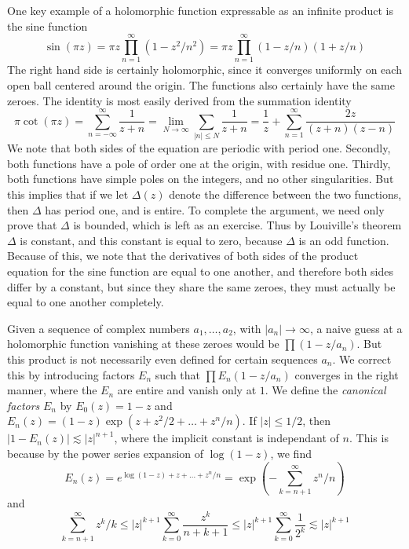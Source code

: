 \begin{example}
    One key example of a holomorphic function expressable as an infinite product is the sine function
    \[ \sin(\pi z) = \pi z \prod_{n = 1}^\infty (1 - z^2/n^2) = \pi z \prod_{n = 1}^\infty (1 - z/n)(1 + z/n) \]
    The right hand side is certainly holomorphic, since it converges uniformly on each open ball centered around the origin. The functions also certainly have the same zeroes. The identity is most easily derived from the summation identity
    \[ \pi \cot(\pi z) = \sum_{n = -\infty}^\infty \frac{1}{z + n} = \lim_{N \to \infty} \sum_{|n| \leq N} \frac{1}{z + n} = \frac{1}{z} + \sum_{n = 1}^\infty \frac{2z}{(z + n)(z - n)} \]
    We note that both sides of the equation are periodic with period one. Secondly, both functions have a pole of order one at the origin, with residue one. Thirdly, both functions have simple poles on the integers, and no other singularities. But this implies that if we let $\Delta(z)$ denote the difference between the two functions, then $\Delta$ has period one, and is entire. To complete the argument, we need only prove that $\Delta$ is bounded, which is left as an exercise. Thus by Louiville's theorem $\Delta$ is constant, and this constant is equal to zero, because $\Delta$ is an odd function. Because of this, we note that the derivatives of both sides of the product equation for the sine function are equal to one another, and therefore both sides differ by a constant, but since they share the same zeroes, they must actually be equal to one another completely.
\end{example}

Given a sequence of complex numbers $a_1, \dots, a_2$, with $|a_n| \to \infty$, a naive guess at a holomorphic function vanishing at these zeroes would be $\prod (1 - z/a_n)$. But this product is not necessarily even defined for certain sequences $a_n$. We correct this by introducing factors $E_n$ such that $\prod E_n(1 - z/a_n)$ converges in the right manner, where the $E_n$ are entire and vanish only at $1$. We define the {\it canonical factors} $E_n$ by $E_0(z) = 1 - z$ and $E_n(z) = (1 - z)\exp(z + z^2/2 + \dots + z^n/n)$. If $|z| \leq 1/2$, then $|1 - E_n(z)| \lesssim |z|^{n+1}$, where the implicit constant is independant of $n$. This is because by the power series expansion of $\log(1 - z)$, we find
%
\[ E_n(z) = e^{\log(1 - z) + z + \dots + z^n/n} = \exp \left( -\sum_{k = n+1}^\infty z^n/n \right) \]
%
and
%
\[ \sum_{k = n+1}^\infty z^k/k \leq |z|^{k+1} \sum_{k = 0}^\infty \frac{z^k}{n+k+1} \leq |z|^{k+1} \sum_{k = 0}^\infty \frac{1}{2^k} \lesssim |z|^{k+1} \]



